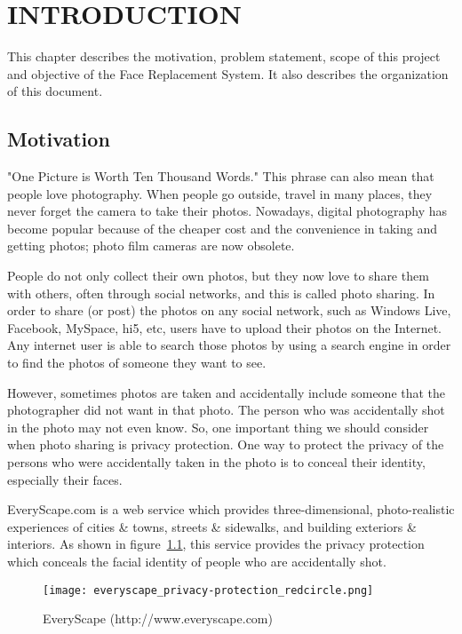 \chapter{INTRODUCTION}\label{chap:INTRODUCTION}
\hspace{0.5in}This chapter describes the motivation, problem statement, scope of this project and objective of the Face Replacement System. It also describes the organization of this document.

\section{Motivation}

\hspace{0.5in}"One Picture is Worth Ten Thousand Words." This phrase can also mean that people love photography. When people go outside, travel in many places, they never forget the camera to take their photos. Nowadays, digital photography has become popular because of the cheaper cost and the convenience in taking and getting photos; photo film cameras are now obsolete.

People do not only collect their own photos, but they now love to share them with others, often through social networks, and this is called photo sharing. In order to share (or post) the photos on any social network, such as Windows Live, Facebook, MySpace, hi5, etc, users have to upload their photos on the Internet. Any internet user is able to search those photos by using a search engine in order to find the photos of someone they want to see.

However, sometimes photos are taken and accidentally include someone that the photographer did not want in that photo. The person who was accidentally shot in the photo may not even know. So, one important thing we should consider when photo sharing is privacy protection. One way to protect the privacy of the persons who were accidentally taken in the photo is to conceal their identity, especially their faces.

EveryScape.com is a web service which provides three-dimensional, photo-realistic experiences of cities \& towns, streets \& sidewalks, and building exteriors \& interiors. As shown in figure~\ref{fig:EveryScape}, this service provides the privacy protection which conceals the facial identity of people who are accidentally shot.

\begin{figure}[htb]
   \centering
   \texttt{[image: everyscape\_privacy-protection\_redcircle.png]}
   \caption{EveryScape (http://www.everyscape.com)}
   \label{fig:EveryScape}
\end{figure}

